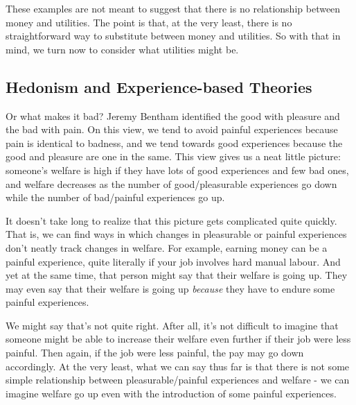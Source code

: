 \documentclass[]{tufte-book}
\begin{document}
These examples are not meant to suggest that there is no relationship between money and utilities. The point is that, at the very least, there is no straightforward way to substitute between money and utilities. So with that in mind, we turn now to consider what utilities might be.

\hypertarget{hedonism-and-experience-based-theories}{%
\subsection{Hedonism and Experience-based Theories}\label{hedonism-and-experience-based-theories}}

 Or what makes it bad? Jeremy Bentham identified the good with pleasure and the bad with pain. On this view, we tend to avoid painful experiences because pain is identical to badness, and we tend towards good experiences because the good and pleasure are one in the same. This view gives us a neat little picture: someone's welfare is high if they have lots of good experiences and few bad ones, and welfare decreases as the number of good/pleasurable experiences go down while the number of bad/painful experiences go up.

It doesn't take long to realize that this picture gets complicated quite quickly. That is, we can find ways in which changes in pleasurable or painful experiences don't neatly track changes in welfare. For example, earning money can be a painful experience, quite literally if your job involves hard manual labour. And yet at the same time, that person might say that their welfare is going up. They may even say that their welfare is going up \emph{because} they have to endure some painful experiences.

We might say that's not quite right. After all, it's not difficult to imagine that someone might be able to increase their welfare even further if their job were less painful. Then again, if the job were less painful, the pay may go down accordingly. At the very least, what we can say thus far is that there is not some simple relationship between pleasurable/painful experiences and welfare - we can imagine welfare go up even with the introduction of some painful experiences.
\end{document}
